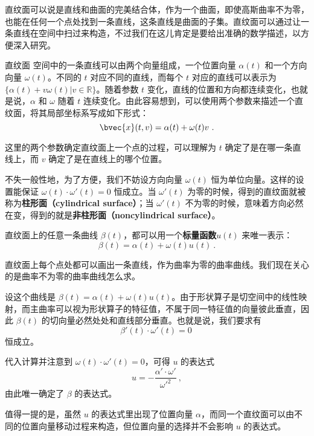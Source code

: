 

直纹面可以说是直线和曲面的完美结合体，作为一个曲面，即使高斯曲率不为零，也能在任何一个点处找到一条直线，这条直线是曲面的子集。直纹面可以通过让一条直线在空间中扫过来构造，不过我们在这儿肯定是要给出准确的数学描述，以方便深入研究。

\begin{definition}{直纹面}
空间中的一条直线可以由两个向量组成，一个位置向量 $\alpha(t)$ 和一个方向向量 $\omega(t)$。不同的 $t$ 对应不同的直线，而每个 $t$ 对应的直线可以表示为 $\{\alpha(t)+v\omega(t)|v\in\mathbb{R}\}$。随着参数 $t$ 变化，直线的位置和方向都连续变化，也就是说，$\alpha$ 和 $\omega$ 随着 $t$ 连续变化。由此容易想到，可以使用两个参数来描述一个直纹面，将其局部坐标系写成如下形式：
\begin{equation}
\bvec{x}(t, v)=\alpha(t)+\omega(t)v~.
\end{equation}
\end{definition}


这里的两个参数确定直纹面上一个点的过程，可以理解为 $t$ 确定了是在哪一条直线上，而 $v$ 确定了是在直线上的哪个位置。

不失一般性地，为了方便，我们不妨设方向向量 $\omega(t)$ 恒为单位向量。这样的设置能保证 $\omega(t)\cdot\omega'(t)=0$ 恒成立。当 $\omega'(t)$ 为零的时候，得到的直纹面就被称为\textbf{柱形面（cylindrical surface）}；当 $\omega'(t)$ 不为零的时候，意味着方向必然在变，得到的就是\textbf{非柱形面（noncylindrical surface）}。

直纹面上的任意一条曲线 $\beta(t)$，都可以用一个\textbf{标量函数}$u(t)$ 来唯一表示：\begin{equation}
\beta(t)=\alpha(t)+\omega(t)u(t)~.
\end{equation}

直纹面上每个点处都可以画出一条直线，作为曲率为零的曲率曲线。我们现在关心的是曲率不为零的曲率曲线怎么求。

设这个曲线是 $\beta(t)=\alpha(t)+\omega(t)u(t)$。由于形状算子是切空间中的线性映射，而主曲率可以视为形状算子的特征值，不属于同一特征值的向量彼此垂直，因此 $\beta(t)$ 的切向量必然处处和直线部分垂直。也就是说，我们要求有
\begin{equation}
\beta'(t)\cdot\omega'(t)=0~
\end{equation}
恒成立。

代入计算并注意到 $\omega(t)\cdot\omega'(t)=0$，可得 $u$ 的表达式\begin{equation}
u=-\frac{\alpha'\cdot\omega'}{\omega'^2}~,
\end{equation}
由此唯一确定了 $\beta$ 的表达式。

值得一提的是，虽然 $u$ 的表达式里出现了位置向量 $\alpha$，而同一个直纹面可以由不同的位置向量移动过程来构造，但位置向量的选择并不会影响 $u$ 的表达式。




